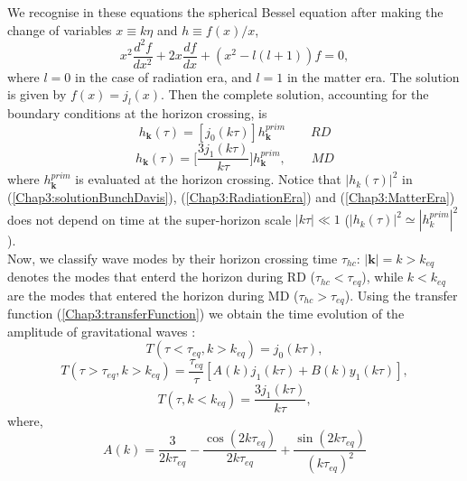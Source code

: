 \documentclass[11pt,a4paper,twoside]{book}
\begin{document}
 We recognise in these equations the spherical Bessel equation after making the change of variables $ x\equiv k\eta $ and $ h\equiv f(x)/x $,
\begin{equation}
	\label{BesselFunction}
	x^{2}\frac{d^{2}f}{dx^{2}} + 2x\frac{df}{dx} + (x^{2} - l(l+1))f = 0,
\end{equation}
where $ l=0 $ in the case of radiation era, and $ l=1 $ in the matter era. The solution is given by $ f(x) = j_{l}(x) $.  Then the complete solution, accounting for the boundary conditions at the horizon crossing, is
\begin{equation}
	\label{Chap3:solutionRadiationEra}
	h_{\textbf{k}}(\tau)=[j_{0}(k\tau)]h_{\textbf{k}}^{prim}
	\qquad
	RD
\end{equation}
\begin{equation}
	\label{Chap3:solutionMatterEra}
	h_{\textbf{k}}(\tau) = \Big [\frac{3 j_{1}(k\tau)}{k\tau}\Big] h_{\textbf{k}}^{prim},
	\qquad
	MD
\end{equation}
where $ h_{\textbf{k}}^{prim} $ is evaluated at the horizon crossing.
Notice that $ |h_{k}(\tau)|^{2} $ in (\ref{Chap3:solutionBunchDavis}), (\ref{Chap3:RadiationEra}) and (\ref{Chap3:MatterEra}) does not depend on time at the super-horizon scale $ |k\tau| \ll 1$  ($ |h_{k}(\tau)|^{2} \simeq|h_{k}^{prim}|^{2} $).\\
Now, we classify wave modes by their horizon crossing time  $\tau_{hc}$: 
 $ |\textbf{k}|= k > k_{eq} $ denotes the modes that enterd the horizon during RD ($ \tau_{hc} < \tau_{eq} $), while $ k < k_{eq} $ are the modes that entered the horizon during MD ($ \tau_{hc} > \tau_{eq} $). Using the transfer function (\ref{Chap3:transferFunction}) we obtain the time evolution of the amplitude of gravitational waves \cite{Chap3:GW_Watanabe_Komatsu}:
 \begin{equation}
 	\label{Chap3:TF1}
 	T(\tau < \tau_{eq}, k>k_{eq}) = j_{0}(k\tau),
 \end{equation}
\begin{equation}
	\label{Chap3:TF2}
     T(\tau > \tau_{eq}, k > k_{eq}) = \frac{\tau_{eq}}{\tau}[A(k)j_{1}(k\tau) + B(k)y_{1}(k\tau)],
\end{equation}
\begin{equation}
	\label{Chap3:TF3}
	T(\tau,k<k_{eq}) = \frac{3j_{1}(k\tau)}{k\tau},
\end{equation}
where,
\begin{equation}
\label{Chap3:A(k)}
A(k) = \frac{3}{2k\tau_{eq}}-\frac{\cos(2k\tau_{eq})}{2k\tau_{eq}} + \frac{\sin(2k\tau_{eq})}{(k\tau_{eq})^{2}} 
\end{equation}
\end{document}
